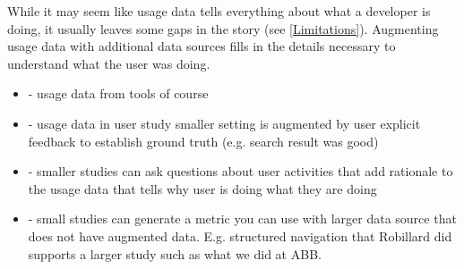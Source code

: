 While it may seem like usage data tells everything about what a developer is doing, it usually leaves some gaps in the story (see \ref{Limitations}).  Augmenting usage data with additional data sources fills in the details necessary to understand what the user was doing.  
    \begin{itemize}
    \item
	- usage data from tools of course
\item
	- usage data in user study smaller setting is augmented by user explicit feedback to establish ground truth (e.g. search result was good)
\item
	- smaller studies can ask questions about user activities that add rationale to the usage data that tells why user is doing what they are doing
\item
	- small studies can generate a metric you can use with larger data source that does not have augmented data.  E.g. structured navigation that Robillard did supports a larger study such as what we did at ABB.
    \end{itemize}
    